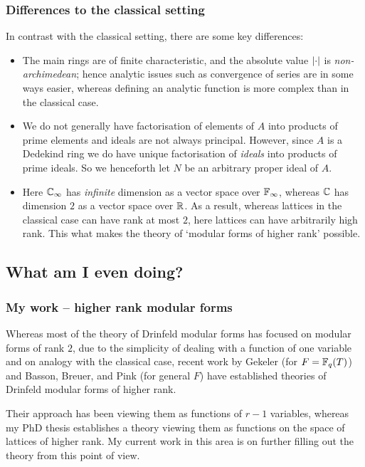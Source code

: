 \begin{frame} \frametitle{Differences to the classical setting}
  In contrast with the classical setting, there are some key differences: \pause
  \begin{itemize}
    \item The main rings are of finite characteristic, and the absolute value $\left\lvert\cdot\right\rvert$ is \emph{non-archimedean}; hence analytic issues such as convergence of series are in some ways easier, whereas defining an analytic function is more complex than in the classical case. \pause
    \item We do not generally have factorisation of elements of $A$ into products of prime elements and ideals are not always principal. However, since $A$ is a Dedekind ring we do have unique factorisation of \emph{ideals} into products of prime ideals. \pause So we henceforth let $N$ be an arbitrary proper ideal of $A$. \pause
    \item Here $\mathbb{C}_\infty$ has \emph{infinite} dimension as a vector space over $\mathbb{F}_\infty$, whereas $\mathbb{C}$ has dimension $2$ as a vector space over $\mathbb{R}$. \pause
    As a result, whereas lattices in the classical case can have rank at most $2$, here lattices can have arbitrarily high rank. This what makes the theory of `modular forms of higher rank' possible.
  \end{itemize}
\end{frame}


\subsection{What am I even doing?}

\begin{frame} \frametitle{My work -- higher rank modular forms}
  Whereas most of the theory of Drinfeld modular forms has focused on modular forms of rank $2$, due to the simplicity of dealing with a function of one variable and on analogy with the classical case, recent work by Gekeler (for $F = \mathbb{F}_q(T)$) and Basson, Breuer, and Pink (for general $F$) have established theories of Drinfeld modular forms of higher rank. \pause
  
  Their approach has been viewing them as functions of $r-1$ variables, whereas my PhD thesis establishes a theory viewing them as functions on the space of lattices of higher rank. \pause
  My current work in this area is on further filling out the theory from this point of view.

\end{frame}


